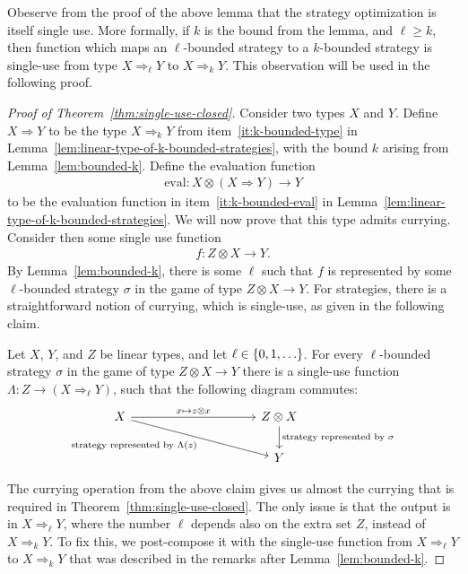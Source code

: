 Obeserve from the proof of the above lemma that the strategy optimization is itself single use. More formally, if $k$ is the bound from the lemma, and $\ell \ge k$, then function which maps an $\ell$-bounded strategy to a $k$-bounded strategy is single-use from type $X \Rightarrow_\ell Y$ to $X \Rightarrow_k Y$. This observation will be used in the following proof.

\begin{proof}[Proof of Theorem~\ref{thm:single-use-closed}]
    Consider two types $X$ and $Y$. Define $X \Rightarrow Y$ to be the type $X \Rightarrow_k Y$ from item~\ref{it:k-bounded-type} in Lemma~\ref{lem:linear-type-of-k-bounded-strategies}, with the bound $k$ arising from Lemma~\ref{lem:bounded-k}. Define the evaluation function 
    \begin{align*}
    \text{eval} : X \otimes (X \Rightarrow Y) \to Y 
    \end{align*}
    to be the evaluation function in item~\ref{it:k-bounded-eval} in Lemma~\ref{lem:linear-type-of-k-bounded-strategies}. We will now prove that this type admits currying. Consider then some single use function 
    \begin{align*}
    f : Z \otimes X \to Y.
    \end{align*}
    By Lemma~\ref{lem:bounded-k}, there is some $\ell$ such that $f$ is represented by some  $\ell$-bounded strategy $\sigma$ in the game of type $Z \otimes X \to Y$. For strategies, there is a straightforward notion of currying, which is single-use, as given in the following claim.

    \begin{claim}
        Let $X$, $Y$, and $Z$ be linear types, and let $\ell \in \{0,1,\ldots\}$. For every $\ell$-bounded strategy $\sigma$ in the game  of type $Z \otimes X \to Y$  there is a single-use function $\Lambda : Z \to (X \Rightarrow_\ell Y)$, such that the following diagram commutes:
        \[
        \begin{tikzcd}
            [column sep=3.5cm]
        X
        \ar[r, "{x \mapsto z \otimes x}"]
        \ar[dr, "\text{strategy represented by $\Lambda(z)$}"']
        &
        Z \otimes X 
        \ar[d, "{\text{strategy represented by $\sigma$}}"] \\
        &
        Y
        \end{tikzcd}
        \]
        \end{claim}
        The currying operation from the above claim gives us almost the currying that is required in Theorem~\ref{thm:single-use-closed}. The only issue is that the output is in $X \Rightarrow_\ell Y$, where the number $\ell$ depends also on the extra set $Z$, instead of $X \Rightarrow_k Y$. To fix this, we post-compose it with the single-use function from $X \Rightarrow_\ell Y$ to $X \Rightarrow_k Y$  that was described in the remarks after Lemma~\ref{lem:bounded-k}. 
    

\end{proof}